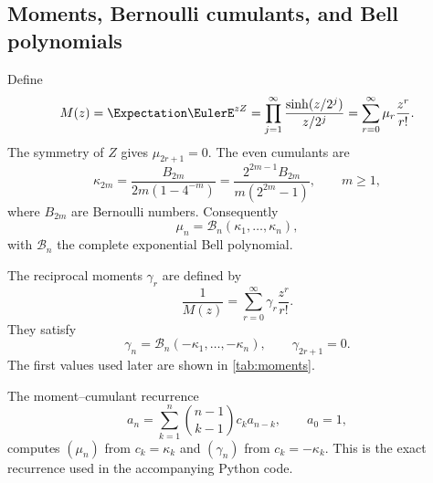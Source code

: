 \documentclass[11pt,oneside]{article}
\theoremstyle{definition}
\theoremstyle{remark}
\newcommand{\Bell}{\mathcal B}
\begin{document}
\subsection{Moments, Bernoulli cumulants, and Bell polynomials}
Define
\begin{equation}
 M(z)=\Expectation\EulerE^{zZ}
 =\prod_{j=1}^{\infty}
   \frac{\sinh(z/2^j)}{z/2^j}
 =\sum_{r=0}^{\infty}\mu_r\frac{z^r}{r!}.
 \label{eq:mgf}
\end{equation}
The symmetry of $Z$ gives $\mu_{2r+1}=0$.  The even cumulants are
\begin{equation}
 \kappa_{2m}
 =\frac{B_{2m}}{2m(1-4^{-m})}
 =\frac{2^{2m-1}B_{2m}}{m(2^{2m}-1)},
 \qquad m\ge1,
 \label{eq:cumulants}
\end{equation}
where $B_{2m}$ are Bernoulli numbers.  Consequently
\begin{equation}
 \mu_n=\Bell_n(\kappa_1,\ldots,\kappa_n),
 \label{eq:mu-bell}
\end{equation}
with $\Bell_n$ the complete exponential Bell polynomial.

The reciprocal moments $\gamma_r$ are defined by
\begin{equation}
 \frac1{M(z)}=\sum_{r=0}^{\infty}\gamma_r\frac{z^r}{r!}.
 \label{eq:gamma-def}
\end{equation}
They satisfy
\begin{equation}
 \gamma_n=\Bell_n(-\kappa_1,\ldots,-\kappa_n),
 \qquad \gamma_{2r+1}=0.
 \label{eq:gamma-bell}
\end{equation}
The first values used later are shown in \cref{tab:moments}.

\begin{table}[htbp]
\centering
\caption{Moment and reciprocal-moment coefficients.}
\label{tab:moments}

\end{table}

The moment--cumulant recurrence
\begin{equation}
 a_n=\sum_{k=1}^{n}\binom{n-1}{k-1}c_k a_{n-k},
 \qquad a_0=1,
 \label{eq:moment-cumulant-recurrence}
\end{equation}
computes $(\mu_n)$ from $c_k=\kappa_k$ and $(\gamma_n)$ from
$c_k=-\kappa_k$.  This is the exact recurrence used in the accompanying
Python code.
\end{document}
